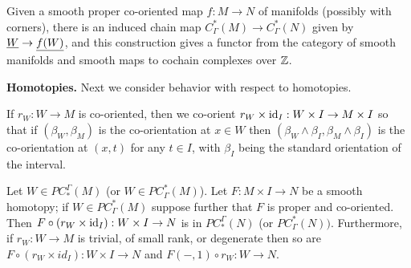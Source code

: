 \begin{corollary}
Given a smooth proper co-oriented map $f \colon M \to N$ of manifolds (possibly with corners), there is an induced chain map $C^*_\Gamma(M) \to C^*_\Gamma(N)$ given by $\underline{W} \to \underline{f(W)}$, and this construction gives a functor from the category of smooth manifolds and smooth maps to cochain complexes over $\mathbb{Z}$.
\end{corollary}



\noindent\textbf{Homotopies.} Next we consider behavior with respect to homotopies.

\begin{convention}
If $r_W \colon W \to M$ is co-oriented, then we co-orient $r_W \times \mathrm{id}_I:W \times I \to M \times I$ so that if $(\beta_W,\beta_M)$ is the co-orientation at $x \in W$ then $(\beta_W \wedge \beta_I,\beta_M \wedge \beta_I)$ is the co-orientation at $(x,t)$ for any $t \in I$, with $\beta_I$ being the standard orientation of the interval.
\end{convention}


\begin{lemma}\label{L: dessicated homotopy}
	Let $W \in PC_*^\Gamma(M)$ (or $W \in PC^*_\Gamma(M)$).
Let $F \colon M \times I \to N$ be a smooth homotopy; if $W \in PC^*_\Gamma(M)$ suppose further that $F$ is proper and co-oriented. Then $F\circ (r_W \times \mathrm{id}_I):W \times I \to N$ is in $PC_*^\Gamma(N)$ (or $PC^*_\Gamma(N))$. Furthermore,
if $r_W: W \to M$ is trivial, of small rank, or
	degenerate then so are
	$F \circ (r_W \times id_I) \colon W \times I \to N$ and $F(-,1)\circ r_W: W \to N$.
\end{lemma}

